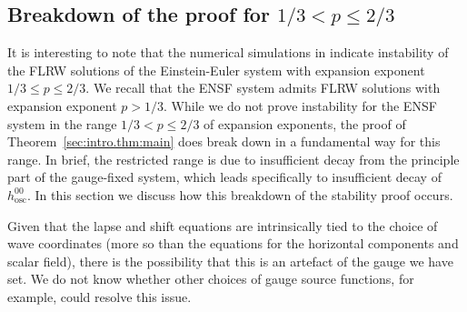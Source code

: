 \documentclass{article}
\newcommand{\osc}{\mathrm{osc}}
\begin{document}
\subsection{Breakdown of the proof for \texorpdfstring{$1/3 < p \leq 2/3$}{p between one third and two thirds}}\label{sec:intro.subsec:breakdown}
It is interesting to note that the numerical simulations in \cite{Mar:instabilityFLRW:25} indicate instability of the FLRW solutions of the Einstein-Euler system with expansion exponent $1/3 \leq p \leq 2/3$. We recall that the ENSF system admits FLRW solutions with expansion exponent $p > 1/3$. While we do not prove instability for the ENSF system in the range $1/3 < p \leq 2/3$ of expansion exponents, the proof of Theorem~\ref{sec:intro.thm:main} does break down in a fundamental way for this range. In brief, the restricted range is due to insufficient decay from the principle part of the gauge-fixed system, which leads specifically to insufficient decay of $h_{\osc}^{00}$. In this section we discuss how this breakdown of the stability proof occurs.
\begin{remark}\label{sec:intro.rmk:proofbreakdown}
     Given that the lapse and shift equations are intrinsically tied to the choice of wave coordinates (more so than the equations for the horizontal components and scalar field), there is the possibility that this is an artefact of the gauge we have set. We do not know whether other choices of gauge source functions, for example, could resolve this issue.
\end{remark}
\end{document}
